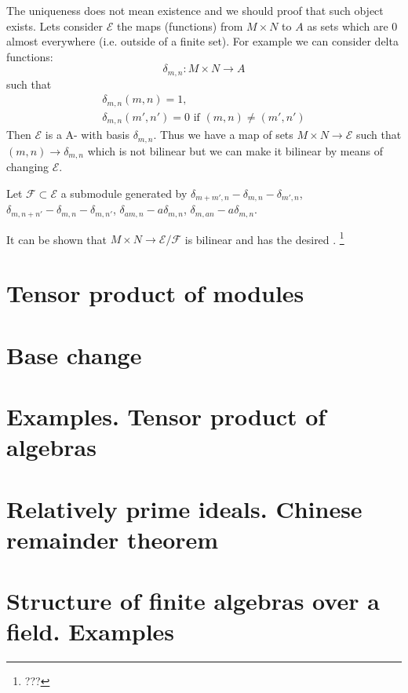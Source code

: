 The uniqueness does not mean existence and we should proof that such
object exists. Lets consider $\mathcal{E}$ the maps (functions) from
$M \times N$ to $A$ as sets which are $0$ almost everywhere
(i.e. outside of a finite set). For example we can consider delta
functions:
\[
\delta_{m,n} : M \times N \to A
\]
such that
\begin{eqnarray}
  \delta_{m,n}(m,n) = 1,
  \nonumber \\
  \delta_{m,n}(m',n') = 0 \mbox{ if } (m,n) \ne (m',n')
  \nonumber 
\end{eqnarray}
Then $\mathcal{E}$ is a A- with basis
$\delta_{m,n}$. Thus we have a map of sets $M \times N \to
\mathcal{E}$ such that $(m,n) \to \delta_{m,n}$ which is not bilinear
but we can make it bilinear by means of changing $\mathcal{E}$.

Let $\mathcal{F} \subset \mathcal{E}$ a submodule generated by
$\delta_{m+m',n} - \delta_{m,n} - \delta_{m',n}$,
$\delta_{m,n+n'} - \delta_{m,n} - \delta_{m,n'}$,
$\delta_{am,n} - a\delta_{m,n}$,
$\delta_{m,an} - a\delta_{m,n}$.

It can be shown that $M \times N \to \mathcal{E}/\mathcal{F}$ is
bilinear and has the desired .
\footnote{
  ???
}


\section{Tensor product of modules}

\section{Base change}

\section{Examples. Tensor product of algebras}

\section{Relatively prime ideals. Chinese remainder theorem}

\section{Structure of finite algebras over a field. Examples}
